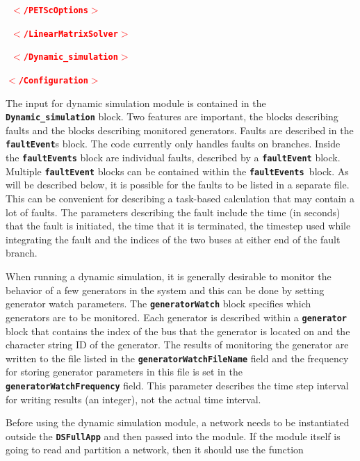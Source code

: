 \documentclass[12pt]{report} %
\begin{document}
\textcolor{red}{\texttt{\textbf{      $\boldsymbol{\mathrm{<}}$/PETScOptions$\boldsymbol{\mathrm{>}}$}}}

\textcolor{red}{\texttt{\textbf{    $\boldsymbol{\mathrm{<}}$/LinearMatrixSolver$\boldsymbol{\mathrm{>}}$}}}

\textcolor{red}{\texttt{\textbf{  $\boldsymbol{\mathrm{<}}$/Dynamic\_simulation$\boldsymbol{\mathrm{>}}$}}}

\textcolor{red}{\texttt{\textbf{$\boldsymbol{\mathrm{<}}$/Configuration$\boldsymbol{\mathrm{>}}$}}}

The input for dynamic simulation module is contained in the \texttt{\textbf{Dynamic\_simulation}} block. Two features are important, the blocks describing faults and the blocks describing monitored generators. Faults are described in the \texttt{\textbf{faultEvent}}s block. The code currently only handles faults on branches. Inside the \texttt{\textbf{faultEvents}} block are individual faults, described by a \texttt{\textbf{faultEvent}} block. Multiple \texttt{\textbf{faultEvent}} blocks can be contained within the \texttt{\textbf{faultEvents }}block. As will be described below, it is possible for the faults to be listed in a separate file. This can be convenient for describing a task-based calculation that may contain a lot of faults. The parameters describing the fault include the time (in seconds) that the fault is initiated, the time that it is terminated, the timestep used while integrating the fault and the indices of the two buses at either end of the fault branch.

When running a dynamic simulation, it is generally desirable to monitor the behavior of a few generators in the system and this can be done by setting generator watch parameters. The \texttt{\textbf{generatorWatch}} block specifies which generators are to be monitored. Each generator is described within a \texttt{\textbf{generator}} block that contains the index of the bus that the generator is located on and the character string ID of the generator. The results of monitoring the generator are written to the file listed in the \texttt{\textbf{generatorWatchFileName}} field and the frequency for storing generator parameters in this file is set in the \texttt{\textbf{generatorWatchFrequency}} field. This parameter describes the time step interval for writing results (an integer), not the actual time interval.

Before using the dynamic simulation module, a network needs to be instantiated outside the \texttt{\textbf{DSFullApp}} and then passed into the module. If the module itself is going to read and partition a network, then it should use the function
\end{document}
